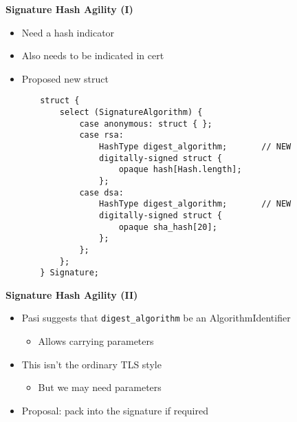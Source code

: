\documentclass[helvetica,fancybox,landscape]{seminar}
\newcommand{\heading}[1]{%
  \begin{center} 
    \large\bf 
    #1 
  \end{center} 
  \vspace{.4 in}}
\begin{document}
\begin{slide}
\heading{Signature Hash Agility (I)}

\begin{itemize}
\item Need a hash indicator
\item Also needs to be indicated in cert
\item Proposed new struct
\end{itemize}

{\tiny
\begin{verbatim}
       struct {
           select (SignatureAlgorithm) {
               case anonymous: struct { };
               case rsa:
                   HashType digest_algorithm;       // NEW
                   digitally-signed struct {
                       opaque hash[Hash.length];
                   };
               case dsa:
                   HashType digest_algorithm;       // NEW
                   digitally-signed struct {
                       opaque sha_hash[20];
                   };
               };
           };
       } Signature;
\end{verbatim}
}

\end{slide}


\begin{slide}
\heading{Signature Hash Agility (II)}

\begin{itemize}
\item Pasi suggests that \verb^digest_algorithm^ be an AlgorithmIdentifier
\begin{itemize}
\item Allows carrying parameters
\end{itemize}
\item This isn't the ordinary TLS style
\begin{itemize}
\item But we may need parameters
\end{itemize}
\item Proposal: pack into the signature if required
\end{itemize}

\end{slide}
\end{document}
